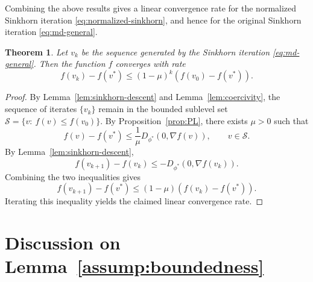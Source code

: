 \documentclass{article}
\theoremstyle{plain}
\newtheorem{theorem}{Theorem}
\theoremstyle{remark}
\begin{document}
Combining the above results gives a linear convergence rate for the normalized Sinkhorn iteration \eqref{eq:normalized-sinkhorn}, and hence for the original Sinkhorn iteration \eqref{eq:md-general}.
\begin{theorem}\label{thm:sinkhorn-linear-conv}
Let $v_k$ be the sequence generated by the Sinkhorn iteration \eqref{eq:md-general}. Then the function $f$ converges with rate 
\[
f(v_k)-f(v^*)
\le
(1-\mu)^k(f(v_0)-f(v^*)).
\]
\end{theorem}
\begin{proof}
By Lemma~\ref{lem:sinkhorn-descent} and Lemma~\ref{lem:coercivity}, the sequence of iterates $\{ v_k \}$ remain in the bounded sublevel set $\mathcal S=\{v:\ f(v)\le f(v_0)\}$. By Proposition~\ref{prop:PL}, there exists $\mu>0$ such that
\[f(v)-f(v^*)
\le
\frac1\mu
D_{\phi^*}(0,\nabla f(v)),
\qquad v\in\mathcal S.
\]
By Lemma~\ref{lem:sinkhorn-descent},
\[
f(v_{k+1})-f(v_k)\le -D_{\phi^*}(0,\nabla f(v_k)).
\]
Combining the two inequalities gives
\[
f(v_{k+1})-f(v^*)\le (1-\mu)(f(v_k)-f(v^*)).
\]
Iterating this inequality yields the claimed linear convergence rate.
\end{proof}

\section{Discussion on Lemma~\ref{assump:boundedness}}
\end{document}
